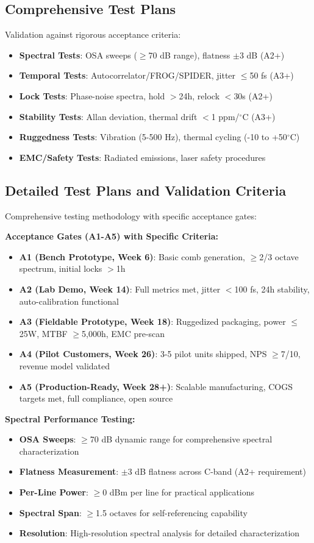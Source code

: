 \documentclass[11pt,a4paper]{article}
\begin{document}
\subsection{Comprehensive Test Plans}
Validation against rigorous acceptance criteria:
\begin{itemize}
\item \textbf{Spectral Tests}: OSA sweeps ($\geq$70 dB range), flatness $\pm$3 dB (A2+)
\item \textbf{Temporal Tests}: Autocorrelator/FROG/SPIDER, jitter $\leq$50 fs (A3+)
\item \textbf{Lock Tests}: Phase-noise spectra, hold $>$24h, relock $<$30s (A2+)
\item \textbf{Stability Tests}: Allan deviation, thermal drift $<$1 ppm/$^\circ$C (A3+)
\item \textbf{Ruggedness Tests}: Vibration (5-500 Hz), thermal cycling (-10 to +50$^\circ$C)
\item \textbf{EMC/Safety Tests}: Radiated emissions, laser safety procedures
\end{itemize}

\subsection{Detailed Test Plans and Validation Criteria}
Comprehensive testing methodology with specific acceptance gates:

\textbf{Acceptance Gates (A1-A5) with Specific Criteria:}
\begin{itemize}
\item \textbf{A1 (Bench Prototype, Week 6)}: Basic comb generation, $\geq$2/3 octave spectrum, initial locks $>$1h
\item \textbf{A2 (Lab Demo, Week 14)}: Full metrics met, jitter $<$100 fs, 24h stability, auto-calibration functional
\item \textbf{A3 (Fieldable Prototype, Week 18)}: Ruggedized packaging, power $\leq$25W, MTBF $\geq$5,000h, EMC pre-scan
\item \textbf{A4 (Pilot Customers, Week 26)}: 3-5 pilot units shipped, NPS $\geq$7/10, revenue model validated
\item \textbf{A5 (Production-Ready, Week 28+)}: Scalable manufacturing, COGS targets met, full compliance, open source
\end{itemize}

\textbf{Spectral Performance Testing:}
\begin{itemize}
\item \textbf{OSA Sweeps}: $\geq$70 dB dynamic range for comprehensive spectral characterization
\item \textbf{Flatness Measurement}: $\pm$3 dB flatness across C-band (A2+ requirement)
\item \textbf{Per-Line Power}: $\geq$0 dBm per line for practical applications
\item \textbf{Spectral Span}: $\geq$1.5 octaves for self-referencing capability
\item \textbf{Resolution}: High-resolution spectral analysis for detailed characterization
\end{itemize}
\end{document}
